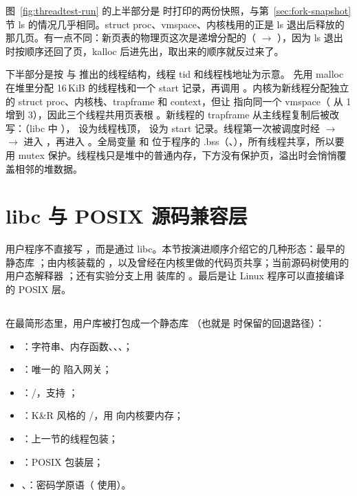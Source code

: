 图~\ref{fig:threadtest-run} 的上半部分是  时打印的两份快照，与第~\ref{sec:fork-snapshot} 节 ls 的情况几乎相同。struct proc、vmspace、内核栈用的正是 ls 退出后释放的那几页。有一点不同：新页表的物理页这次是递增分配的（ $\to$ ），因为 ls 退出时按顺序还回了页，kalloc 后进先出，取出来的顺序就反过来了。

下半部分是按  与  推出的线程结构，线程 tid 和线程栈地址为示意。 先用 malloc 在堆里分配 16\,KiB 的线程栈和一个 start 记录，再调用 。内核为新线程分配独立的 struct proc、内核栈、trapframe 和 context，但让  指向同一个 vmspace（ 从 1 增到 3），因此三个线程共用页表根 。新线程的 trapframe 从主线程复制后被改写：（libc 中 ）， 设为线程栈顶， 设为 start 记录。线程第一次被调度时经  $\to$  $\to$  进入 ，再进入 。全局变量  和  位于程序的 .bss（、），所有线程共享，所以要用 mutex 保护。线程栈只是堆中的普通内存，下方没有保护页，溢出时会悄悄覆盖相邻的堆数据。

\section{libc 与 POSIX 源码兼容层}
\label{sec:posix}

用户程序不直接写 ，而是通过 libc。本节按演进顺序介绍它的几种形态：最早的静态库 ；由内核装载的 ，以及曾经在内核里做的代码页共享；当前源码树使用的用户态解释器 ；还有实验分支上用  装库的 。最后是让 Linux 程序可以直接编译的 POSIX 层。

\subsection{}

在最简形态里，用户库被打包成一个静态库 （也就是  时保留的回退路径）：

\begin{itemize}
  \item {}：字符串、内存函数、、、；
  \item {}：唯一的  陷入网关；
  \item {}：/，支持 ；
  \item {}：K\&R 风格的 /，用  向内核要内存；
  \item {}：上一节的线程包装；
  \item {}：POSIX 包装层；
  \item {}、：密码学原语（ 使用）。
\end{itemize}

